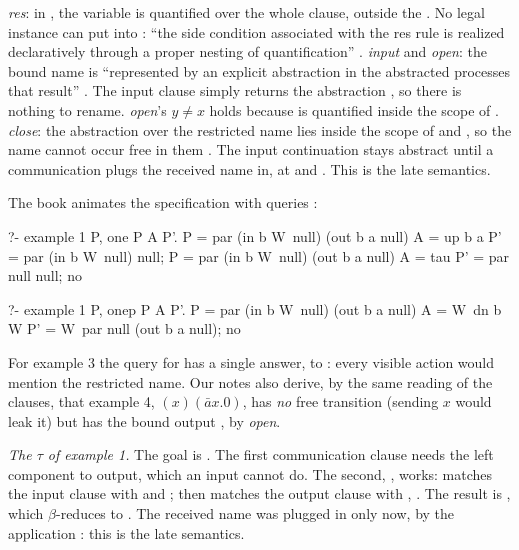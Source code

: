 {{\begin{tutorial}
\emph{res}: in , the variable  is quantified
over the whole clause, outside the . No legal instance can put  into : ``the side
condition associated with the res rule is realized declaratively through a proper nesting of
quantification'' . \emph{input} and \emph{open}: the bound name is ``represented by an explicit
abstraction in the abstracted processes that result'' . The input clause simply returns the
abstraction , so there is nothing to rename. \emph{open}'s $y\neq x$ holds because  is
quantified inside the scope of . \emph{close}: the abstraction over the restricted name lies inside
the scope of  and , so the name cannot occur free in them . The input
continuation stays abstract until a communication plugs the received name in, at  and .
This is the late semantics.
\end{tutorial}

\noindent The book animates the specification with queries :

\begin{lprolog}
?- example 1 P, one P A P'.
P = par (in b W\ null) (out b a null)
A = up b a
P' = par (in b W\ null) null;
P = par (in b W\ null) (out b a null)
A = tau
P' = par null null;
no

?- example 1 P, onep P A P'.
P = par (in b W\ null) (out b a null)
A = W\ dn b W
P' = W\ par null (out b a null);
no
\end{lprolog}

\noindent For example 3 the query for  has a single answer,  to
 : every visible action would mention the restricted name. Our notes also derive, by the same reading of the clauses, that example 4,
$(x)(\bar a x.0)$, has \emph{no} free transition (sending $x$ would leak it) but has the bound output
,  by \emph{open}.

\begin{tutorial}
\emph{The $\tau$ of example 1.} The goal is . The
first communication clause needs the left component to output, which an input cannot do. The second,
, works:
 matches the input clause with  and ; then
 matches the output clause with , . The result
 is , which $\beta$-reduces to . The
received name was plugged in only now, by the application : this is the late semantics.



\end{tutorial}}}
